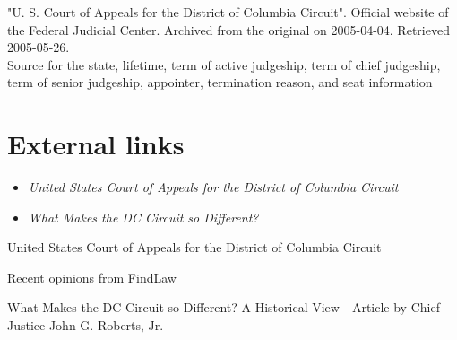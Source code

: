 "U. S. Court of Appeals for the District of Columbia Circuit". Official
website of the Federal Judicial Center. Archived from the original on
2005-04-04. Retrieved 2005-05-26.\\
Source for the state, lifetime, term of active judgeship, term of chief
judgeship, term of senior judgeship, appointer, termination reason, and
seat information

\section{External links}\label{external-links}

\begin{itemize}
\item
  \emph{United States Court of Appeals for the District of Columbia
  Circuit}
\item
  \emph{What Makes the DC Circuit so Different?}
\end{itemize}

United States Court of Appeals for the District of Columbia Circuit

Recent opinions from FindLaw

What Makes the DC Circuit so Different? A Historical View - Article by
Chief Justice John G. Roberts, Jr.
